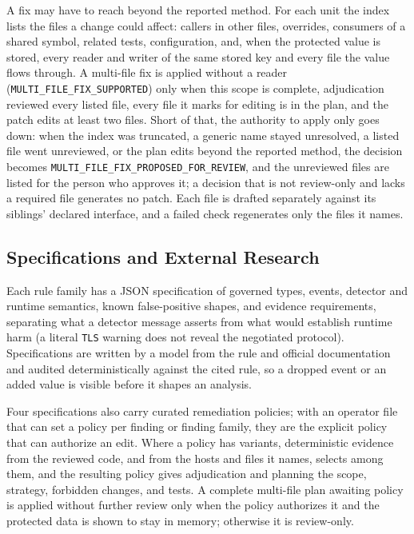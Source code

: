 \documentclass[conference]{IEEEtran}
\begin{document}
A fix may have to reach beyond the reported method. For each unit the index
lists the files a change could affect: callers in other files, overrides,
consumers of a shared symbol, related tests, configuration, and, when the
protected value is stored, every reader and writer of the same stored key and
every file the value flows through. A multi-file fix is applied without a
reader (\texttt{MULTI\_FILE\_FIX\_SUPPORTED}) only when this scope is complete,
adjudication reviewed every listed file, every file it marks for editing is in
the plan, and the patch edits at least two files. Short of that, the authority to apply
only goes down: when the index was truncated, a generic name stayed
unresolved, a listed file went unreviewed, or the plan edits beyond the
reported method, the decision becomes
\texttt{MULTI\_FILE\_FIX\_}\allowbreak\texttt{PROPOSED\_FOR\_REVIEW}, and the
unreviewed files are listed for the person who approves it; a decision that
is not review-only and lacks a required file generates no patch. Each file is
drafted separately against its siblings' declared interface, and a failed
check regenerates only the files it names.

\subsection{Specifications and External Research}

Each rule family has a JSON specification of governed types, events, detector
and runtime semantics, known false-positive shapes, and evidence requirements,
separating what a detector message asserts from what would establish runtime
harm (a literal \texttt{TLS} warning does not reveal the negotiated protocol).
Specifications are written by a model from the rule and official documentation
and audited deterministically against the cited rule, so a dropped event or an
added value is visible before it shapes an analysis.

Four specifications also carry curated remediation policies; with an
operator file that can set a policy per finding or finding family, they are the
explicit policy that can authorize an edit. Where a policy has variants,
deterministic evidence from the reviewed code, and from the hosts and files it
names, selects among them, and the resulting policy gives adjudication and
planning the scope, strategy, forbidden changes, and tests. A complete
multi-file plan awaiting policy is applied without further review only when the
policy authorizes it and the protected data is shown to stay in memory;
otherwise it is review-only.
\end{document}
